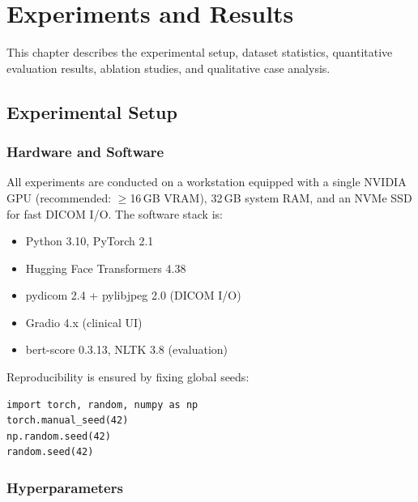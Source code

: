 \chapter{Experiments and Results}
\label{ch:results}

\begin{infobox}
This chapter describes the experimental setup, dataset statistics,
quantitative evaluation results, ablation studies, and qualitative
case analysis.
\end{infobox}

\section{Experimental Setup}
\label{sec:setup}

\subsection{Hardware and Software}
\label{subsec:hw}

All experiments are conducted on a workstation equipped with a single
NVIDIA GPU (recommended: $\geq$16\,GB VRAM), 32\,GB system RAM, and
an NVMe SSD for fast DICOM I/O.
The software stack is:

\begin{itemize}
  \item Python 3.10, PyTorch 2.1~\citep{paszke2019pytorch}
  \item Hugging Face Transformers 4.38~\citep{wolf2020transformers}
  \item pydicom 2.4 + pylibjpeg 2.0 (DICOM I/O)
  \item Gradio 4.x (clinical UI)
  \item bert-score 0.3.13, NLTK 3.8 (evaluation)
\end{itemize}

Reproducibility is ensured by fixing global seeds:
\begin{lstlisting}[caption={Seed setting for reproducibility.}]
import torch, random, numpy as np
torch.manual_seed(42)
np.random.seed(42)
random.seed(42)
\end{lstlisting}

\subsection{Hyperparameters}
\label{subsec:hparams}

